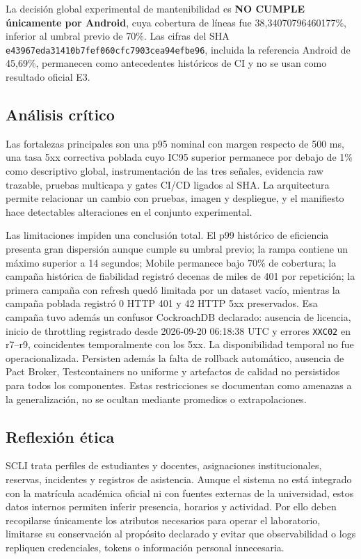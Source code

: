 La decisión global experimental de mantenibilidad es \textbf{NO CUMPLE
únicamente por Android}, cuya cobertura de líneas fue
38,34070796460177\%, inferior al umbral previo de 70\%. Las cifras del SHA
\texttt{e43967eda31410b7fef060cfc7903cea94efbe96}, incluida la referencia
Android de 45,69\%, permanecen como antecedentes históricos de CI y no se usan
como resultado oficial E3.

\subsection{Análisis crítico}
\label{subsec:analisis-critico-final}

Las fortalezas principales son una p95 nominal con margen respecto de
500 ms, una tasa 5xx correctiva poblada cuyo IC95 superior permanece por debajo
de 1\% como descriptivo global, instrumentación de las tres señales, evidencia raw trazable, pruebas
multicapa y gates CI/CD ligados al SHA. La
arquitectura permite relacionar un cambio con pruebas, imagen y despliegue, y el
manifiesto hace detectables alteraciones en el conjunto experimental.

Las limitaciones impiden una conclusión total. El p99 histórico de eficiencia presenta
gran dispersión aunque cumple su umbral previo; la rampa contiene un máximo
superior a 14 segundos; Mobile permanece bajo 70\% de cobertura; la campaña histórica de
fiabilidad registró decenas de miles de 401 por repetición; la primera campaña
con refresh quedó limitada por un dataset vacío, mientras la campaña poblada
registró 0 HTTP 401 y 42 HTTP 5xx preservados. Esa campaña tuvo además un
confusor CockroachDB declarado: ausencia de licencia, inicio de throttling
registrado desde 2026-09-20 06:18:38 UTC y errores \texttt{XXC02} en r7--r9,
coincidentes temporalmente con los 5xx. La disponibilidad temporal no
fue operacionalizada. Persisten además la falta de rollback automático,
ausencia de Pact Broker, Testcontainers no uniforme y artefactos de calidad no
persistidos para todos los componentes. Estas restricciones se documentan como
amenazas a la generalización, no se ocultan mediante promedios o extrapolaciones.

\subsection{Reflexión ética}
\label{subsec:reflexion-etica}

SCLI trata perfiles de estudiantes y docentes, asignaciones institucionales,
reservas, incidentes y registros de asistencia. Aunque el sistema no está
integrado con la matrícula académica oficial ni con fuentes externas de la
universidad, estos datos internos permiten inferir presencia, horarios y
actividad. Por ello deben recopilarse únicamente los atributos necesarios para
operar el laboratorio, limitarse su conservación al propósito declarado y
evitar que observabilidad o logs repliquen credenciales, tokens o información
personal innecesaria.

